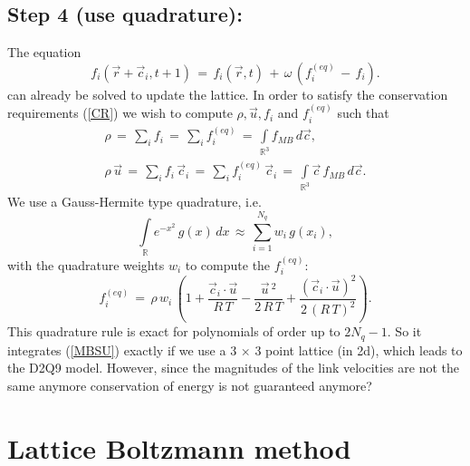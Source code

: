 \subsection{Step 4 (use quadrature):}

The equation 
\begin{equation}
 f_i (\vec r + \vec c_i, t+1)\,=\, f_i(\vec r , t) \, + \, \omega \, (f_i^{(eq)} \, -\, f_i ).\label{LBM}
\end{equation}
can already be solved to update the lattice. In order to satisfy the conservation requirements (\ref{CR}) we wish to compute $\rho, \vec u, f_i$ and $f_i^{(eq)}$ such that
\begin{eqnarray}
 \rho \,=\, \sum_i f_i \,=\, \sum_i f_i^{(eq)} \,=\,   \int \limits_{\mathbb{R}^3}  f_{MB} \, d\vec c,  \nonumber \\
 \rho \,\vec u\,=\, \sum_i f_i \, \vec c_i\,=\, \sum_i f_i^{(eq)} \, \vec c_i\,=\, \int \limits_{\mathbb{R}^3} \vec c \, f_{MB}\, d\vec c. \nonumber
\end{eqnarray}
We use a Gauss-Hermite type quadrature, i.e.
\begin{equation}
 \int \limits_{\mathbb{R}}  e^{-x^2} \, g(x) \, dx\,\approx\, \sum \limits_{i=1}^{N_q} w_i \, g(x_i),\nonumber
\end{equation}
with the quadrature weights $w_i$ to compute the $f_i^{(eq)}$:
\begin{equation}
 f_i^{(eq)}\,=\,  \rho \, w_i \, \left( 1 + \frac{ \vec c_i \cdot \vec u}{R \, T} -\frac{\vec u\,^2 }{2 \,R \, T}   + \frac{ (\vec c_i \cdot \vec u)^2}{2 \, (R \, T)^2}  \right).\nonumber
\end{equation}
This quadrature rule is exact for polynomials of order up to $2 N_q -1$. So it integrates (\ref{MBSU}) exactly if we use a 3 $\times$ 3 point lattice (in 2d), which leads to the D2Q9 model. However, since the magnitudes of the link velocities are not the same anymore conservation of energy is not guaranteed anymore?

\section{Lattice Boltzmann method}

